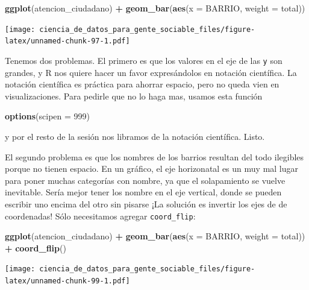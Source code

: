 \documentclass[]{book}
\newenvironment{Shaded}{\begin{snugshade}}{\end{snugshade}}
\newcommand{\KeywordTok}[1]{\textcolor[rgb]{0.13,0.29,0.53}{\textbf{#1}}}
\newcommand{\DataTypeTok}[1]{\textcolor[rgb]{0.13,0.29,0.53}{#1}}
\newcommand{\DecValTok}[1]{\textcolor[rgb]{0.00,0.00,0.81}{#1}}
\newcommand{\StringTok}[1]{\textcolor[rgb]{0.31,0.60,0.02}{#1}}
\newcommand{\OperatorTok}[1]{\textcolor[rgb]{0.81,0.36,0.00}{\textbf{#1}}}
\newcommand{\NormalTok}[1]{#1}
\begin{document}
\begin{Shaded}
\begin{Highlighting}[]
\KeywordTok{ggplot}\NormalTok{(atencion_ciudadano) }\OperatorTok{+}
\StringTok{    }\KeywordTok{geom_bar}\NormalTok{(}\KeywordTok{aes}\NormalTok{(}\DataTypeTok{x =}\NormalTok{ BARRIO, }\DataTypeTok{weight =}\NormalTok{ total))}
\end{Highlighting}
\end{Shaded}

\texttt{[image: ciencia\_de\_datos\_para\_gente\_sociable\_files/figure-latex/unnamed-chunk-97-1.pdf]}

Tenemos dos problemas. El primero es que los valores en el eje de las
\texttt{y} son grandes, y R nos quiere hacer un favor expresándolos en
notación científica. La notación científica es práctica para ahorrar
espacio, pero no queda vien en visualizaciones. Para pedirle que no lo
haga mas, usamos esta función

\begin{Shaded}
\begin{Highlighting}[]
\KeywordTok{options}\NormalTok{(}\DataTypeTok{scipen =} \DecValTok{999}\NormalTok{)}
\end{Highlighting}
\end{Shaded}

y por el resto de la sesión nos libramos de la notación científica.
Listo.

El segundo problema es que los nombres de los barrios resultan del todo
ilegibles porque no tienen espacio. En un gráfico, el eje horizonatal es
un muy mal lugar para poner muchas categorías con nombre, ya que el
solapamiento se vuelve inevitable. Sería mejor tener los nombre en el
eje vertical, donde se pueden escribir uno encima del otro sin pisarse
¡La solución es invertir los ejes de de coordenadas! Sólo necesitamos
agregar \texttt{coord\_flip}:

\begin{Shaded}
\begin{Highlighting}[]
\KeywordTok{ggplot}\NormalTok{(atencion_ciudadano) }\OperatorTok{+}
\StringTok{    }\KeywordTok{geom_bar}\NormalTok{(}\KeywordTok{aes}\NormalTok{(}\DataTypeTok{x =}\NormalTok{ BARRIO, }\DataTypeTok{weight =}\NormalTok{ total)) }\OperatorTok{+}
\StringTok{    }\KeywordTok{coord_flip}\NormalTok{()}
\end{Highlighting}
\end{Shaded}

\texttt{[image: ciencia\_de\_datos\_para\_gente\_sociable\_files/figure-latex/unnamed-chunk-99-1.pdf]}
\end{document}
